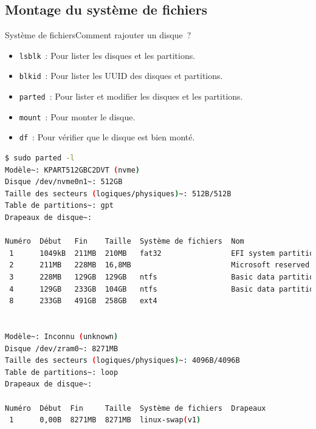 \documentclass{beamer}
\begin{document}
    \subsection{Montage du système de fichiers}\label{subsec:mount}
    \begin{frame}[fragile]{Système de fichiers}{Comment rajouter un disque~?}
        \begin{scriptsize}
            \begin{itemize}
                \item \lstinline{lsblk}~: Pour lister les disques et les partitions.
                \item \lstinline{blkid}~: Pour lister les UUID des disques et partitions.
                \item \lstinline{parted}~: Pour lister et modifier les disques et les partitions.
                \item \lstinline{mount}~: Pour monter le disque.
                \item \lstinline{df}~: Pour vérifier que le disque est bien monté.
            \end{itemize}
            \begin{lstlisting}[language=bash,basicstyle=\tiny\ttfamily]
$ sudo parted -l
Modèle~: KPART512GBC2DVT (nvme)
Disque /dev/nvme0n1~: 512GB
Taille des secteurs (logiques/physiques)~: 512B/512B
Table de partitions~: gpt
Drapeaux de disque~:

Numéro  Début   Fin    Taille  Système de fichiers  Nom                           Drapeaux
 1      1049kB  211MB  210MB   fat32                EFI system partition          démarrage, esp
 2      211MB   228MB  16,8MB                       Microsoft reserved partition  msftres
 3      228MB   129GB  129GB   ntfs                 Basic data partition          msftdata
 4      129GB   233GB  104GB   ntfs                 Basic data partition          msftdata
 8      233GB   491GB  258GB   ext4


Modèle~: Inconnu (unknown)
Disque /dev/zram0~: 8271MB
Taille des secteurs (logiques/physiques)~: 4096B/4096B
Table de partitions~: loop
Drapeaux de disque~:

Numéro  Début  Fin     Taille  Système de fichiers  Drapeaux
 1      0,00B  8271MB  8271MB  linux-swap(v1)
            \end{lstlisting}
        \end{scriptsize}
    \end{frame}
\end{document}
